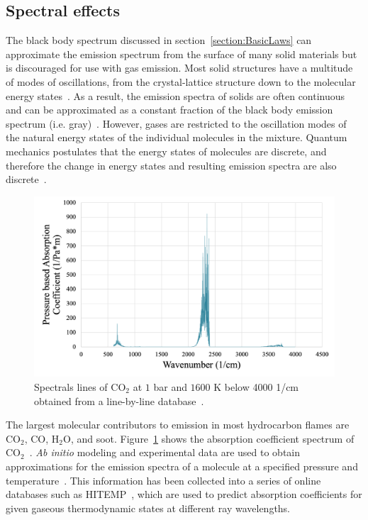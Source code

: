 \subsection{Spectral effects}\label{Sec:Nongray}
The black body spectrum discussed in section~\ref{section:BasicLaws} can approximate the emission spectrum from the surface of many solid materials but is discouraged for use with gas emission. 
Most solid structures have a multitude of modes of oscillations, from the crystal-lattice structure down to the molecular energy states~\cite{Viskanta1975HeatSolids}. As a result, the emission spectra of solids are often continuous and can be approximated as a constant fraction of the black body emission spectrum (i.e. gray)~\cite{Howell2010ThermalTransfer}. 
However, gases are restricted to the oscillation modes of the natural energy states of the individual molecules in the mixture. Quantum mechanics postulates that the energy states of molecules are discrete, and therefore the change in energy states and resulting emission spectra are also discrete~\cite{Hanson2016SpectroscopyGases}.
\begin{figure}
\centering
\includegraphics[width=0.8\linewidth]{figures/ch2/SpectralLinesCO2.png}
\caption{Spectrals lines of CO$_2$ at $1$ bar and $1600$ K below 4000 1/cm obtained from a line-by-line database~\cite{Ren2013AGases}.}
\label{fig:SpectralLines}
\end{figure}


The largest molecular contributors to emission in most hydrocarbon flames are CO$_2$, CO, H$_2$O, and soot. Figure~\ref{fig:SpectralLines} shows the absorption coefficient spectrum of CO$_2$~\cite{Liu2020TheFlames}. 
\textit{Ab initio} modeling and experimental data are used to obtain approximations for the emission spectra of a molecule at a specified pressure and temperature~\cite{Hanson2016SpectroscopyGases}. This information has been collected into a series of online databases such as HITEMP~\cite{Rothman2010HITEMPDatabase}, which are used to predict absorption coefficients for given gaseous thermodynamic states at different ray wavelengths.

